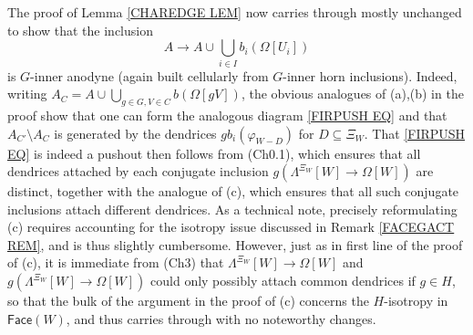 \documentclass[a4paper,10pt
]{article}%
\begin{document}
\begin{remark}
The proof of Lemma \ref{CHAREDGE LEM} now carries through mostly unchanged to show that the inclusion
\begin{equation}
	A \to A \cup \bigcup_{i \in I} b_i(\Omega[U_i])
\end{equation}
is $G$-inner anodyne (again built cellularly from $G$-inner horn inclusions).
Indeed, writing 
$A_C = A \cup \bigcup_{g\in G,V \in C} b(\Omega[gV])$,
the obvious analogues of (a),(b) in the proof
show that one can form the analogous diagram \eqref{FIRPUSH EQ} and that
$A_{C'} \setminus A_{C}$ is generated by the dendrices
$g b_i(\varphi_{W-D})$ for $D \subseteq \Xi_W$. 
That \eqref{FIRPUSH EQ} is indeed a pushout then follows from (Ch0.1), which ensures that all dendrices attached by each conjugate inclusion
$g\left(\Lambda^{\Xi_W}[W] \to \Omega[W]\right)$
are distinct, together with the analogue of (c), 
which ensures that all such conjugate inclusions
attach different dendrices.
As a technical note, precisely reformulating (c) requires accounting for the isotropy issue discussed in Remark \ref{FACEGACT REM}, and is thus slightly cumbersome. However, just as in first line of the proof of (c), it is immediate from (Ch3) that
$\Lambda^{\Xi_W}[W] \to \Omega[W]$
and $g\left(\Lambda^{\Xi_W}[W] \to \Omega[W]\right)$
could only possibly attach common dendrices if $g\in H$, so that the bulk of the argument in the proof of (c) concerns the $H$-isotropy in $\mathsf{Face}(W)$, 
and thus carries through with no noteworthy changes.
\end{remark}
\end{document}
